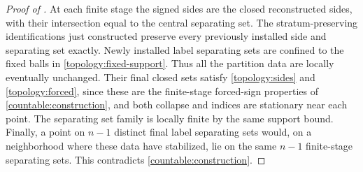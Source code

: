 \begin{proof}[Proof of ]
At each finite stage the signed sides are the closed reconstructed
sides, with their intersection equal to the central separating set.  The
stratum-preserving identifications just constructed preserve every
previously installed side and separating set exactly.  Newly installed label
separating sets are confined to the fixed balls in
\eqref{topology:fixed-support}.  Thus all the partition data are locally
eventually unchanged.  Their final closed sets satisfy
\eqref{topology:sides} and \eqref{topology:forced}, since these are the
finite-stage forced-sign properties of
\cref{countable:construction}, and both collapse and indices are
stationary near each point.  The separating set family is locally finite by the
same support bound.  Finally, a point on $n-1$ distinct final label
separating sets would, on a neighborhood where these data have stabilized, lie
on the same $n-1$ finite-stage separating sets.  This contradicts
\cref{countable:construction}.
\end{proof}
